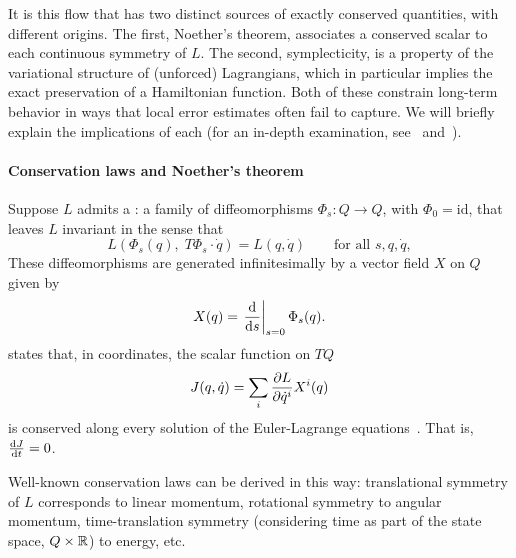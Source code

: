 It is this flow that has two distinct sources of exactly conserved quantities, with different origins. The first, Noether's theorem, associates a conserved scalar to each continuous symmetry of $L$. The second, symplecticity, is a property of the variational structure of (unforced) Lagrangians, which in particular implies the exact preservation of a Hamiltonian function. Both of these constrain long-term behavior in ways that local error estimates often fail to capture. We will briefly explain the implications of each (for an in-depth examination, see~\cite[\S1.2]{marsdenDiscreteMechanicsVariational2001} and~\cite[\S\S7,~11]{marsdenIntroductionMechanicsSymmetry1999}).


\paragraph{Conservation laws and Noether's theorem}

Suppose $L$ admits a : a family of diffeomorphisms $\Phi_s : Q \to Q$, with $\Phi_0 = \mathrm{id}$, that leaves $L$ invariant in the sense that
\begin{equation}
	L\left(\Phi_s(q),\; T\Phi_s \cdot \dot q\right) = L(q, \dot q) \qquad \text{for all } s, q, \dot q,
	\label{eq:symmetry-condition}
\end{equation}
These diffeomorphisms are generated infinitesimally by a vector field $X$ on $Q$ given by
\[
	X(q) = \odv{}{s}_{s=0} \Phi_s(q).
\]
 states that, in coordinates, the scalar function on $TQ$
\begin{equation}
	J(q, \dot q) = \sum_i \pdv{L}{\dot q^i} X^i(q)
	\label{eq:noether-charge}
\end{equation}
is conserved along every solution of the Euler-Lagrange equations~\cite[\S7]{marsdenIntroductionMechanicsSymmetry1999}. That is, $\odv{J}{t} = 0$.%

Well-known conservation laws can be derived in this way: translational symmetry of $L$ corresponds to linear momentum, rotational symmetry to angular momentum, time-translation symmetry (considering time as part of the state space, $Q \times {\mathbb{R}}$) to energy, etc.




